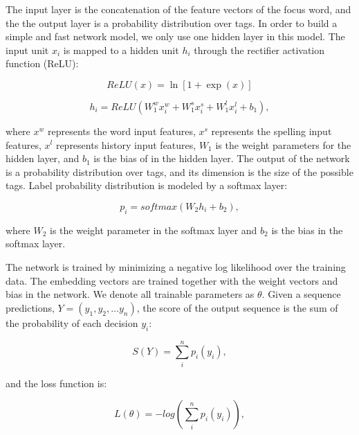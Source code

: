 The input layer is the concatenation of the feature vectors of the focus word, and the the output layer is a probability distribution over tags. In order to build a simple and fast network model, we only use one hidden layer in this model. The input unit $x_{i}$ is mapped to a hidden unit $h_{i}$ through the rectifier activation function (ReLU):

\begin{equation}
ReLU\left(x\right) = \ln\left[1+\exp\left(x\right)\right]
\end{equation}

\begin{equation}
h_{i}=ReLU\left( W_{1}^{w}x_{i}^{w}+W_{1}^{s}x_{i}^{s}+W_{1}^{l}x_{i}^{l}+b_{1}\right),
\end{equation}

where $x^{w}$ represents the word input features, $x^{s}$ represents the spelling input features, $x^{l}$ represents history input features, $W_{1}$ is the weight parameters for the hidden layer, and $b_{1}$ is the bias of in the hidden layer. The output of the network is a probability distribution over tags, and its dimension is the size of the possible tags. Label probability distribution is modeled by a softmax layer:

\begin{equation}
p_{i}=softmax\left(W_{2}h_{i}+b_{2}\right),
\end{equation}

where $W_{2}$ is the weight parameter in the softmax layer and $b_{2}$ is the bias in the softmax layer.

The network is trained by minimizing a negative log likelihood over the training data. The embedding vectors are trained together with the weight vectors and bias in the network. We denote all trainable parameters as $\theta$. Given a sequence predictions, $Y=\left( y_{1},y_{2},\ldots y_{n}\right)$,
the score of the output sequence is the sum of the probability of each decision $y_{i}$: 

\begin{equation}
S\left( Y\right) = \sum _{i}^{n}p_{i}\left(y_{i}\right),
\end{equation}

and the loss function is:

\begin{equation}
L\left(\theta\right) = -log\left(\sum _{i}^{n}p_{i}\left(y_{i}\right)\right),
\end{equation}



